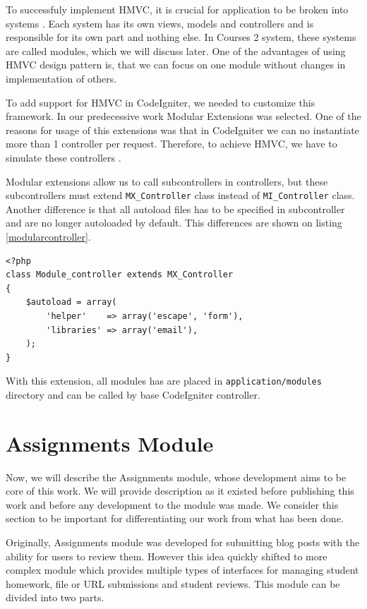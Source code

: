 To successfuly implement HMVC, it is crucial for application to be broken into systems \cite{hmvc}. Each system has its own views, models and controllers and is responsible for its own part and nothing else. In Courses 2 system, these systems are called modules, which we will discuss later. One of the advantages of using HMVC design pattern is, that we can focus on one module without changes in implementation of others.

To add support for HMVC in CodeIgniter, we needed to customize this framework. In our predecessive work Modular Extensions \cite{modularextensions} was selected. One of the reasons for usage of this extensions was that in CodeIgniter we can no instantiate more than 1 controller per request. Therefore, to achieve HMVC, we have to simulate these controllers \cite{modularextensions}. 

Modular extensions allow us to call subcontrollers in controllers, but these subcontrollers must extend \texttt{MX\_Controller} class instead of \texttt{MI\_Controller} class. Another difference is that all autoload files has to  be specified in subcontroller and are no longer autoloaded by default. This differences are shown on listing \ref{modularcontroller}.

\begin{lstlisting}[label={modularcontroller}, caption={Module controller}]
<?php     
class Module_controller extends MX_Controller 
{
    $autoload = array(
        'helper'    => array('escape', 'form'),
        'libraries' => array('email'),
    );
}
\end{lstlisting}


With this extension, all modules has are placed in \texttt{application/modules} directory and can be called by base CodeIgniter controller.

\section{Assignments Module}

Now, we will describe the Assignments module, whose development aims to be core of this work. We will provide description as it existed before publishing this work and before any development to the module was made. We consider this section to be important for differentiating our work from what has been done.

Originally, Assignments module was developed for submitting blog posts with the ability for users to review them. However  this idea quickly shifted to more complex module which provides multiple types of interfaces for managing student homework, file or URL submissions and student reviews. This module can be divided into two parts.

